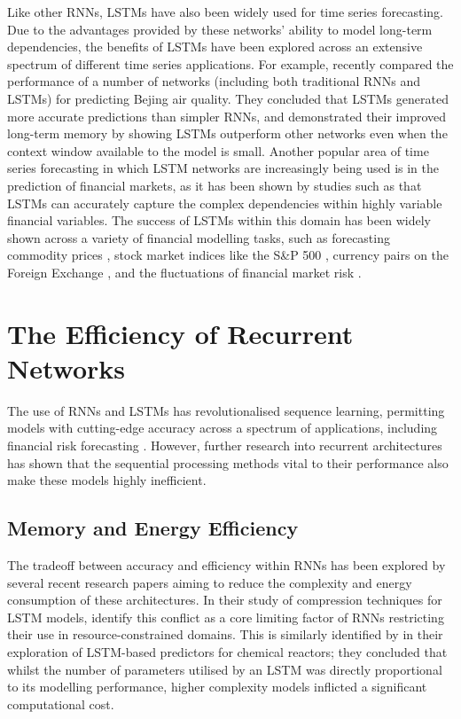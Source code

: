 \documentclass[a4paper, 11pt]{report}
\begin{document}
    Like other RNNs, LSTMs have also been widely used for time series forecasting. Due to the advantages provided by these networks' ability to model long-term dependencies, the benefits of LSTMs have been explored across an extensive spectrum of different time series applications. For example, \citet{shi-2022} recently compared the performance of a number of networks (including both traditional RNNs and LSTMs) for predicting Bejing air quality. They concluded that LSTMs generated more accurate predictions than simpler RNNs, and demonstrated their improved long-term memory by showing LSTMs outperform other networks even when the context window available to the model is small. Another popular area of time series forecasting in which LSTM networks are increasingly being used is in the prediction of financial markets, as it has been shown by studies such as \citet{li-2017} that LSTMs can accurately capture the complex dependencies within highly variable financial variables. The success of LSTMs within this domain has been widely shown across a variety of financial modelling tasks, such as forecasting commodity prices \citep{ly-2021}, stock market indices like the S\&P 500 \citep{fjellstrom-2022}, currency pairs on the Foreign Exchange \citep{qi-2021}, and the fluctuations of financial market risk \citep{du-2019}.


    \section{The Efficiency of Recurrent Networks}

    The use of RNNs and LSTMs has revolutionalised sequence learning, permitting models with cutting-edge accuracy across a spectrum of applications, including financial risk forecasting \citep{du-2019}. However, further research into recurrent architectures has shown that the sequential processing methods vital to their performance also make these models highly inefficient.


    \subsection{Memory and Energy Efficiency}

    The tradeoff between accuracy and efficiency within RNNs has been explored by several recent research papers aiming to reduce the complexity and energy consumption of these architectures. In their study of compression techniques for LSTM models, \citet{wang-2018} identify this conflict as a core limiting factor of RNNs restricting their use in resource-constrained domains. This is similarly identified by \citet{zarzycki-2021} in their exploration of LSTM-based predictors for chemical reactors; they concluded that whilst the number of parameters utilised by an LSTM was directly proportional to its modelling performance, higher complexity models inflicted a significant computational cost. 
\end{document}
